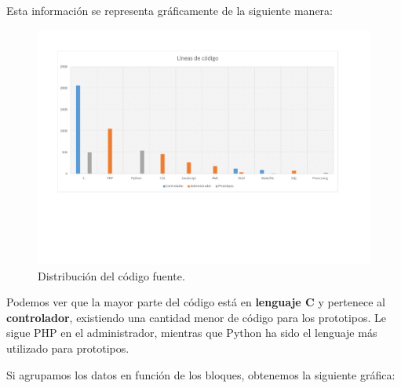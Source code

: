 \smallskip

Esta información se representa gráficamente de la siguiente manera:

\smallskip

\begin{figure}[H]
	\noindent \begin{centering}
		\includegraphics[clip=true,trim=50 180 50 50,width=\linewidth]{capitulo5/lineas}
		\par\end{centering}
	\smallskip
	\caption{\label{fig:lineas} Distribución del código fuente.}
\end{figure} 

\smallskip

Podemos ver que la mayor parte del código está en \textbf{lenguaje C} y pertenece al \textbf{controlador}, existiendo una cantidad menor de código para los prototipos. Le sigue PHP en el administrador, mientras que Python ha sido el lenguaje más utilizado para prototipos.

Si agrupamos los datos en función de los bloques, obtenemos la siguiente gráfica:

\smallskip

